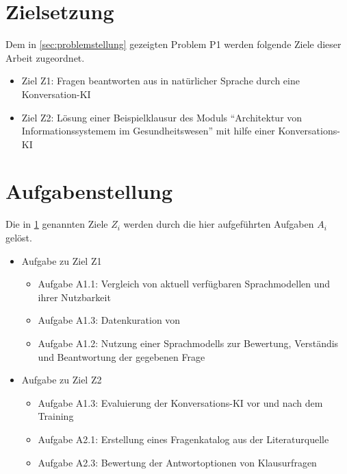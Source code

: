 \section{Zielsetzung}\label{sec:zielsetzung}

Dem in \ref{sec:problemstellung} gezeigten Problem P1 werden folgende Ziele dieser Arbeit zugeordnet.

\begin{itemize}
  \item Ziel Z1: Fragen beantworten aus \citet{bb} in natürlicher Sprache durch eine Konversation-KI
  \item Ziel Z2: Lösung einer Beispielklausur des Moduls \enquote{Architektur von Informationssystemem im Gesundheitswesen} mit hilfe einer Konversations-KI
\end{itemize}

\section{Aufgabenstellung}

Die in \ref{sec:zielsetzung} genannten Ziele $Z_i$ werden durch die hier aufgeführten Aufgaben $A_i$ gelöst.

\begin{itemize}
  \item Aufgabe zu Ziel Z1
  \begin{itemize}
    \item Aufgabe A1.1: Vergleich von aktuell verfügbaren Sprachmodellen und ihrer Nutzbarkeit
    \item Aufgabe A1.3: Datenkuration von \citet{bb}
    \item Aufgabe A1.2: Nutzung einer Sprachmodells zur Bewertung, Verständis und Beantwortung der gegebenen Frage
  \end{itemize}
  \item Aufgabe zu Ziel Z2
  \begin{itemize}
    \item Aufgabe A1.3: Evaluierung der Konversations-KI vor und nach dem Training
    \item Aufgabe A2.1: Erstellung eines Fragenkatalog aus der Literaturquelle
    \item Aufgabe A2.3: Bewertung der Antwortoptionen von Klausurfragen
  \end{itemize}
\end{itemize}

